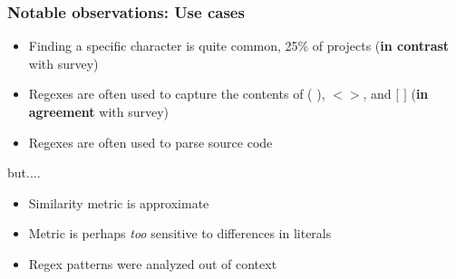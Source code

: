 \begin{frame}
\frametitle{Notable observations: Use cases}

\begin{block}{}
\begin{itemize}
	\item Finding a specific character is quite common, 25\% of projects (\textbf{in contrast} with survey)
	\item Regexes are often used to capture the contents of ( ), $< >$, and $[$ $]$ (\textbf{in agreement} with survey)
	\item Regexes are often used to parse source code
\end{itemize}
\end{block}

but....

\begin{block}{}
\begin{itemize}
	\item Similarity metric is approximate
	\item Metric is perhaps \emph{too} sensitive to differences in literals
	\item Regex patterns were analyzed out of context
\end{itemize}
\end{block}

%


\end{frame}

